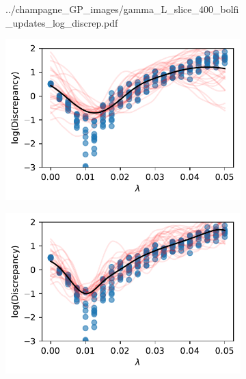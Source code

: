 \begin{figure}[htbp]
\begin{subfigure}[b]{0.5\textwidth}
{            ../champagne_GP_images/gamma_L_slice_400_bolfi_updates_log_discrep.pdf
        }
    \end{subfigure}
    \hfill%
    \begin{subfigure}[b]{0.5\textwidth}
        \centering
        \includegraphics[width=\textwidth]{
            ../champagne_GP_images/initial_lambda_slice_log_discrep.pdf
        }
    \end{subfigure}%
    \hfill%
    \begin{subfigure}[b]{0.5\textwidth}
        \centering
        \includegraphics[width=\textwidth]{
            ../champagne_GP_images/lambda_slice_400_bolfi_updates_log_discrep.pdf
        }
    \end{subfigure}
    \begin{subfigure}[b]{0.5\textwidth}
        \centering

\end{subfigure}
\end{figure}
